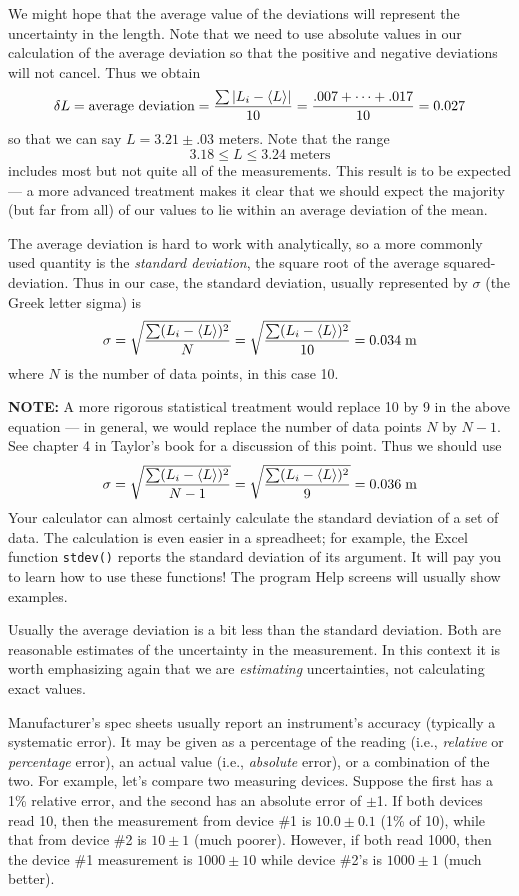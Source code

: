      We might hope that the average value of the deviations will
represent the uncertainty in the length.  Note that we need to
use absolute values in our calculation of the average deviation so that the
positive and negative deviations will not cancel.  Thus we
obtain
\[
\delta L = \mbox{average deviation} = {{\sum |L_{i} - \langle L \rangle|}
  \over {10}} = {{.007 + \cdots + .017} \over {10}} = 0.027
\]
so that we can say $L = 3.21 \pm .03$ meters.  Note that the range
\[
         3.18 \leq L \leq 3.24 \;\mbox{meters}
\]
includes most but not quite all of the measurements.  This result
is to be expected --- a more advanced treatment makes it clear that
we should expect the majority (but far from all) of our values to lie within an
average deviation of the mean.

     The average deviation is hard to work with analytically,
so a more commonly used quantity is the {\em standard
deviation}, the square root of the average squared-deviation.  
Thus in our case, the standard deviation, usually
represented by $\sigma$ (the Greek letter sigma) is
\[
\sigma = \sqrt{ {{\sum (L_{i} - \langle L \rangle)^{2}} \over N}}
 = \sqrt{ {{\sum (L_{i} - \langle L \rangle)^{2}} \over {10}}}
     = 0.034 \;\mbox{m}
\]
where $N$ is the number of data points, in this case 10.

{\bf NOTE:}  A more rigorous statistical treatment would 
replace 10 by 9 in the above equation --- in general, we would
replace the number of data points $N$ by $N-1$.  See chapter 4 
in Taylor's book for
a discussion of this point.  Thus we should use
\[
\sigma = \sqrt{ {{\sum (L_{i} - \langle L \rangle)^{2}} \over {N-1}}}
 =  \sqrt{ {{\sum (L_{i} - \langle L \rangle)^{2}} \over {9}}}
     = 0.036 \;\mbox{m}
\]
Your calculator can almost certainly
calculate the standard deviation of a set of data. The calculation is even easier in a spreadheet; for example, the Excel
function {\tt stdev()} reports the standard deviation of
its argument.  It will pay you to learn
how to use these functions!  The program Help screens will usually show examples.

Usually the average deviation is a bit
less than the standard deviation.  
Both are reasonable
estimates of the uncertainty in the measurement.  In this context
it is worth emphasizing again that we are {\em estimating}
uncertainties, not calculating exact values.

Manufacturer's spec sheets usually report an instrument's accuracy
(typically a systematic error).
It may be given as a percentage of the
reading (i.e., {\em relative} or {\em percentage}  error), an actual value (i.e., {\em absolute}
error), or a combination of the two.  For
example, let's compare two measuring devices.   Suppose the first has
a 1\%
relative error, and the second has an absolute error of $\pm$1.
If both devices read 10, then the measurement from device \#1 is
$10.0 \pm 0.1$ (1\% of 10), while that from device \#2 is $10 \pm 1$ (much
poorer).  However, if both read 1000, then the device \#1
measurement is $1000 \pm 10$ while device \#2's is $1000 \pm 1$ (much
better).

